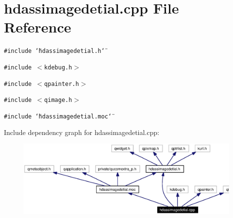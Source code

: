 \section{hdassimagedetial.cpp File Reference}
\label{hdassimagedetial_8cpp}


{\tt \#include \char`\"{}hdassimagedetial.h\char`\"{}}\par
{\tt \#include $<$kdebug.h$>$}\par
{\tt \#include $<$qpainter.h$>$}\par
{\tt \#include $<$qimage.h$>$}\par
{\tt \#include \char`\"{}hdassimagedetial.moc\char`\"{}}\par


Include dependency graph for hdassimagedetial.cpp:\begin{figure}[H]
\begin{center}
\leavevmode
\includegraphics[width=319pt]{hdassimagedetial_8cpp__incl}
\end{center}
\end{figure}
